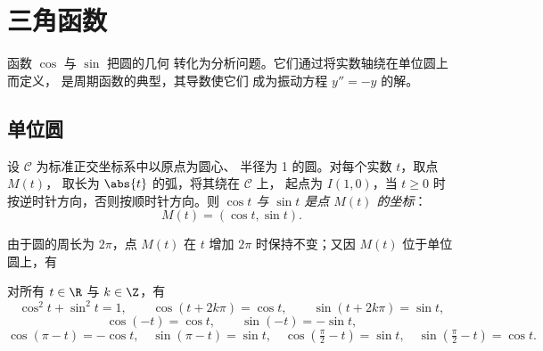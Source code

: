 \chapter{三角函数}\label{ch:g12:trigo}

函数 $\cos$ 与 $\sin$ 把圆的几何
转化为分析问题。它们通过将实数轴绕在单位圆上而定义，
是周期函数的典型，其导数使它们
成为振动方程 $y'' = -y$ 的解。

\section{单位圆}

\begin{definition}[余弦与正弦]\label{def:g12:trigo:cossin}
设 $\mathcal{C}$ 为标准正交坐标系中以原点为圆心、
半径为 1 的圆。对每个实数 $t$，取点 $M(t)$，
取长为 $\abs{t}$ 的弧，将其绕在 $\mathcal{C}$ 上，
起点为 $I(1,0)$，当 $t \geq 0$ 时按逆时针方向，否则按顺时针方向。则
\emph{$\cos t$ 与 $\sin t$ 是点
$M(t)$ 的坐标}：
\[
M(t) = (\cos t, \sin t).
\]
\end{definition}

\begin{omfigure}
\end{omfigure}

由于圆的周长为 $2\pi$，点 $M(t)$
在 $t$ 增加 $2\pi$ 时保持不变；又因 $M(t)$ 位于单位圆上，有

\begin{proposition}[基本恒等式]\label{prop:g12:trigo:identities}
对所有 $t \in \R$ 与 $k \in \Z$，有
\[
\cos^2 t + \sin^2 t = 1, \qquad
\cos(t + 2k\pi) = \cos t, \qquad
\sin(t + 2k\pi) = \sin t,
\]
\[
\cos(-t) = \cos t, \qquad \sin(-t) = -\sin t,
\]
\[
\cos(\pi - t) = -\cos t, \quad \sin(\pi - t) = \sin t, \quad
\cos\left(\tfrac{\pi}{2} - t\right) = \sin t, \quad
\sin\left(\tfrac{\pi}{2} - t\right) = \cos t .
\]
\end{proposition}


